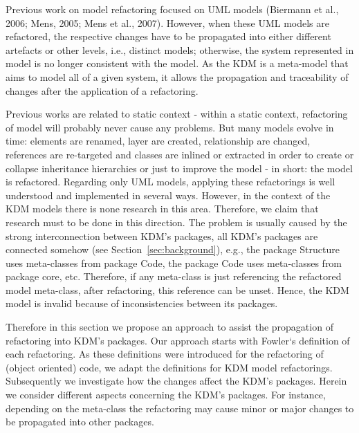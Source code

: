 
Previous work on model refactoring focused on UML models (Biermann et al., 2006; Mens, 2005; Mens et al., 2007). However, when these UML models are refactored, the respective changes have to be propagated into either different artefacts or other levels, i.e., distinct models; otherwise, the system represented in model is no longer consistent with the model. As the KDM is a meta-model that aims to model all of a given system, it allows the propagation and traceability of changes after the application of a refactoring.


Previous works are related to static context - within a static context, refactoring of model will probably never cause any problems. But many models evolve in time: elements are renamed, layer are created, relationship are changed, references are re-targeted and classes are inlined or extracted in order to create or collapse inheritance hierarchies or just to improve the model - in short: the model is refactored. Regarding only UML models, applying these refactorings is well understood and implemented in several ways. However, in the context of the KDM models there is none research in this area. Therefore, we claim that research must to be done in this direction. The problem is usually caused by the strong interconnection between KDM's packages, all KDM's packages are connected somehow (see Section~\ref{sec:background}), e.g., the package Structure uses meta-classes from package Code, the package Code uses meta-classes from package core, etc. Therefore, if any meta-class is just referencing the refactored model meta-class, after refactoring, this reference can be unset. Hence, the KDM model is invalid because of inconsistencies between its packages. 


Therefore in this section we propose an approach to assist the propagation of refactoring into KDM's packages. Our approach starts with Fowler`s definition of each refactoring. As these definitions were introduced for the refactoring of (object oriented) code, we adapt the definitions for KDM model refactorings. Subsequently we investigate how the changes affect the KDM's packages. Herein we consider different aspects concerning the KDM's packages. For instance, depending on the meta-class the refactoring may cause minor or major changes to be propagated into other packages.

